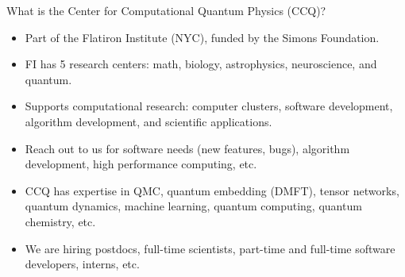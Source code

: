 \begin{frame}{What is the Center for Computational Quantum Physics (CCQ)?}

\begin{itemize}[<+->]

  \item Part of the Flatiron Institute (NYC), funded by the Simons Foundation.
  \item FI has 5 research centers: math, biology, astrophysics, neuroscience, and quantum.
  \item Supports computational research: computer clusters, software development, algorithm development, and scientific applications.
  \item Reach out to us for software needs (new features, bugs), algorithm development, high performance computing, etc.
  \item CCQ has expertise in QMC, quantum embedding (DMFT), tensor networks, quantum dynamics, machine learning, quantum computing, quantum chemistry, etc.
  \item We are hiring postdocs, full-time scientists, part-time and full-time software developers, interns, etc.

\end{itemize}

\end{frame}

